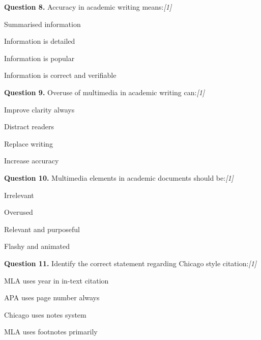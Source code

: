 \documentclass[11pt,a4paper]{article}
\newcommand{\pts}[1]{\hfill   \textit{[#1]}}
\begin{document}
\noindent   \textbf{Question 8.} Accuracy in academic writing means:\pts{1}

\begin{parts}
  \item Summarised information
  \item Information is detailed
  \item Information is popular
  \item Information is correct and verifiable
\end{parts}

\medskip




\noindent   \textbf{Question 9.} Overuse of multimedia in academic writing can:\pts{1}

\begin{parts}
  \item Improve clarity always
  \item Distract readers
  \item Replace writing
  \item Increase accuracy
\end{parts}

\medskip




\noindent   \textbf{Question 10.} Multimedia elements in academic documents should be:\pts{1}

\begin{parts}
  \item Irrelevant
  \item Overused
  \item Relevant and purposeful
  \item Flashy and animated
\end{parts}

\medskip




\noindent   \textbf{Question 11.} Identify the correct statement regarding Chicago style citation:\pts{1}

\begin{parts}
  \item MLA uses year in in-text citation
  \item APA uses page number always
  \item Chicago uses notes system
  \item MLA uses footnotes primarily
\end{parts}

\medskip
\end{document}
